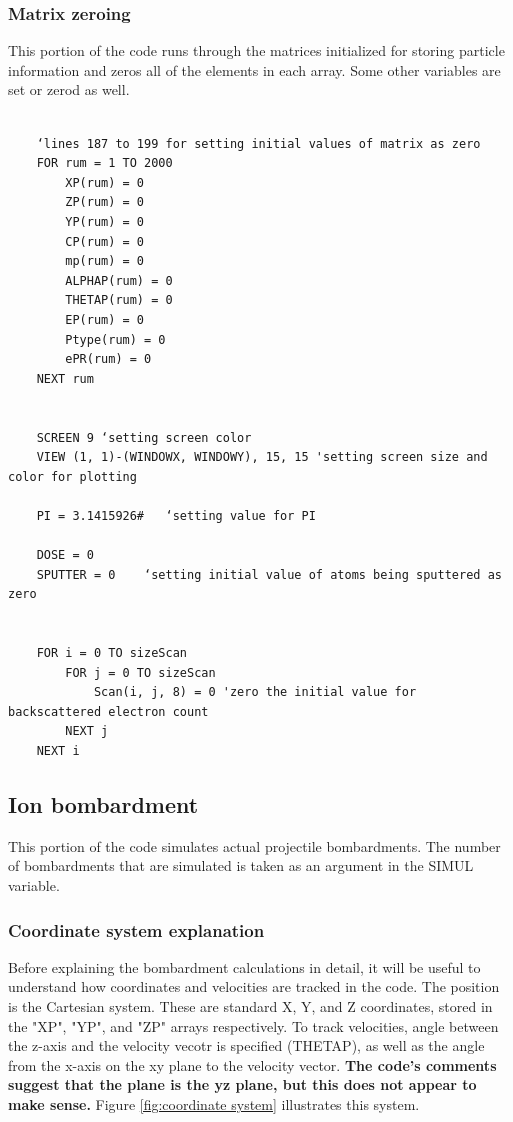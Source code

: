 \documentclass[10pt, reqno]{exam}
\begin{document}
\subsubsection{Matrix zeroing}  

This portion of the code runs through the matrices initialized for storing particle information and zeros all of the elements in each array. Some other variables are set or zerod as well.

\begin{verbatim}

    ‘lines 187 to 199 for setting initial values of matrix as zero
    FOR rum = 1 TO 2000
        XP(rum) = 0
        ZP(rum) = 0
        YP(rum) = 0
        CP(rum) = 0
        mp(rum) = 0
        ALPHAP(rum) = 0
        THETAP(rum) = 0
        EP(rum) = 0
        Ptype(rum) = 0
        ePR(rum) = 0
    NEXT rum
    
    
    SCREEN 9 ‘setting screen color
    VIEW (1, 1)-(WINDOWX, WINDOWY), 15, 15 'setting screen size and color for plotting
    
    PI = 3.1415926#   ‘setting value for PI
    
    DOSE = 0
    SPUTTER = 0    ‘setting initial value of atoms being sputtered as zero
    
    
    FOR i = 0 TO sizeScan
        FOR j = 0 TO sizeScan
            Scan(i, j, 8) = 0 'zero the initial value for backscattered electron count
        NEXT j
    NEXT i
\end{verbatim}
\subsection{Ion bombardment}
\label{sec:ion bombardment}
This portion of the code simulates actual projectile bombardments. The number of bombardments that are simulated is taken as an argument in the SIMUL variable.

\subsubsection{Coordinate system explanation}

Before explaining the bombardment calculations in detail, it will be useful to understand how coordinates and velocities are tracked in the code. The position is the Cartesian system. These are standard X, Y, and Z coordinates, stored in the "XP", "YP", and "ZP" arrays respectively. To track velocities, angle between the z-axis and the velocity vecotr is specified (THETAP), as well as the angle from the x-axis on the xy plane to the velocity vector. \textbf{The code's comments suggest that the plane is the yz plane, but this does not appear to make sense.} Figure \ref{fig:coordinate system} illustrates this system.
\end{document}
